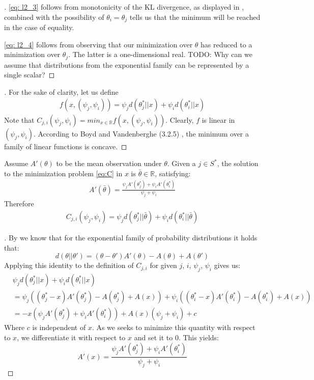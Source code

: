 \begin{proof}[]
  \eqref{eq: l2_3} follows from monotonicity of the KL divergence, as displayed
  in , combined with the possibility of $\theta_i =
  \theta_j$ tells us that the minimum will be reached in the case of equality.

  \eqref{eq: l2_4} follows from observing that our minimization over $\theta$
  has reduced to a minimization over $\theta_j$. The latter is a one-dimensional
  real.
  TODO: Why can we assume that distributions from the exponential family can be represented by a single scalar?
\end{proof}

\begin{proof}[]
  For the sake of clarity, let us define
  \begin{align}
    f(x, (\psi_j, \psi_i)) = \psi_j d(\theta_j^*||x) + \psi_i d(\theta_i^* || x)
  \end{align}
  Note that $C_{j, i}(\psi_j, \psi_i) = min_{x \in \mathbb{R}} f(x,(\psi_j, \psi_i))$. Clearly, $f$ is linear in $(\psi_j, \psi_i)$. According to Boyd and Vandenberghe (3.2.5) \cite{Boyd:2004:CO:993483}, the minimum over a family of linear functions is concave.
\end{proof}

\textbf{}
Assume $A'(\theta)$ to be the mean observation under $\theta$. Given a $j \in S^*$, the solution to the minimization problem \eqref{eq:C} in $x$ is $\bar{\theta} \in \mathbb{R}$, satisfying:
\begin{align}
  A'(\bar{\theta}) = \frac{\psi_j A'(\theta_j^*) + \psi_i
      A'(\theta_i^*)}{\psi_j + \psi_i}
\end{align}
Therefore
\begin{align}
  C_{j, i}(\psi_j, \psi_i) = \psi_j d(\theta^*_j || \bar{\theta}) + \psi_i
      d(\theta^*_i || \bar{\theta})
\end{align}
\begin{proof}[]
  By  we know that for the exponential family of probability distributions it holds that:
  \[d(\theta||\theta') = (\theta - \theta')A'(\theta) - A(\theta) + A(\theta')\]
  Applying this identity to the definition of $C_{j, i}$ \label{eq:C} for given $j$, $i$, $\psi_j$, $\psi_i$ gives us:
  \begin{align}
    &\psi_{j}d(\theta^*_{j} || x) + \psi_{i}d(\theta_{i}^* ||x) \\
    &=\psi_j ((\theta_j^* - x)A'(\theta_j^*) - A(\theta_j^*) + A(x)) + \psi_i((\theta_i^* - x)A'(\theta_i^*) - A(\theta_i^*) + A(x))\\
    &= -x(\psi_j A'(\theta_j^*) + \psi_i A'(\theta_i^*)) + A(x)(\psi_j + \psi_i) + c
  \end{align}
  Where $c$ is independent of $x$. As we seeks to minimize this quantity with respect to $x$, we differentiate it with respect to $x$ and set it to 0. This yields:
  \[A'(x) = \frac{\psi_j A'(\theta_j^*) + \psi_i A'(\theta_i^*)}{\psi_j + \psi_i}\]
\end{proof}

